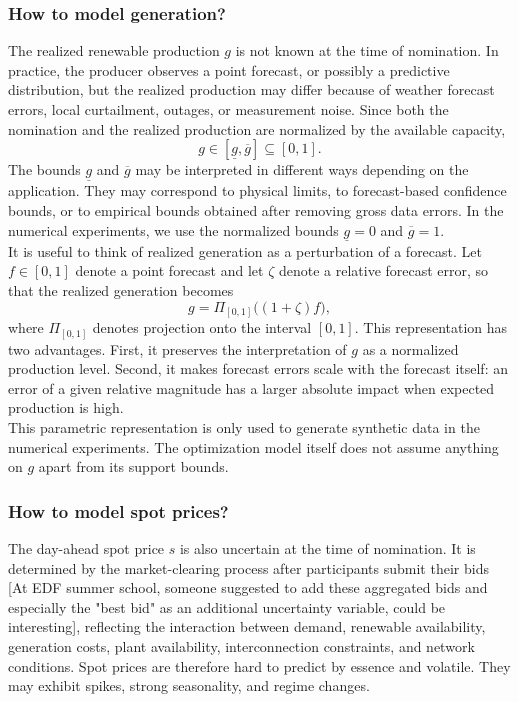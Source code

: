 \documentclass[11pt]{article}
\theoremstyle{plain}
\theoremstyle{definition}
\begin{document}
\subsubsection{How to model generation?}
\label{subsubsec:model-generation}

The realized renewable production $g$ is not known at the time of nomination. 
In practice, the producer observes a point forecast, or possibly a predictive distribution, but the realized production may differ because of weather forecast errors, local curtailment, outages, or measurement noise. 
Since both the nomination and the realized production are normalized by the available capacity, 
\[
    g\in[\underline g,\overline g]\subseteq[0,1].
\]
The bounds $\underline g$ and $\overline g$ may be interpreted in different ways depending on the application. 
They may correspond to physical limits, to forecast-based confidence bounds, or to empirical bounds obtained after removing gross data errors. 
In the numerical experiments, we use the normalized bounds $\underline g=0$ and $\overline g=1$.
\\

\noindent It is useful to think of realized generation as a perturbation of a forecast. 
Let $f\in[0,1]$ denote a point forecast and let $\zeta$ denote a relative forecast error, so that the realized generation becomes
\[
    g=\Pi_{[0,1]}\big((1+\zeta)f\big),
\]
where $\Pi_{[0,1]}$ denotes projection onto the interval $[0,1]$. 
This representation has two advantages. 
First, it preserves the interpretation of $g$ as a normalized production level. 
Second, it makes forecast errors scale with the forecast itself: an error of a given relative magnitude has a larger absolute impact when expected production is high.
\\

\noindent This parametric representation is only used to generate synthetic data in the numerical experiments. 
The optimization model itself does not assume anything on $g$ apart from its support bounds. 


\subsubsection{How to model spot prices?}
\label{subsubsec:model-spot-price}

The day-ahead spot price $s$ is also uncertain at the time of nomination. 
It is determined by the market-clearing process after participants submit their bids \color{red}[At EDF summer school, someone suggested to add these aggregated bids and especially the "best bid" as an additional uncertainty variable, could be interesting]\color{black}, reflecting the interaction between demand, renewable availability, generation costs, plant availability, interconnection constraints, and network conditions. 
Spot prices are therefore hard to predict by essence and volatile.
They may exhibit spikes, strong seasonality, and regime changes.
\\
\end{document}

